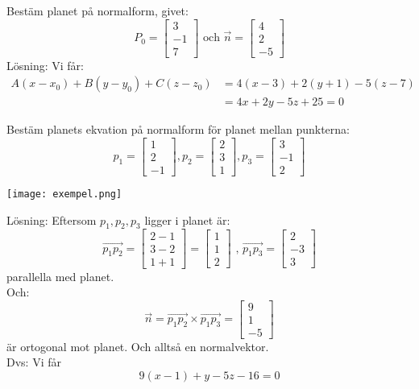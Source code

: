 \begin{Ex}
    Bestäm planet på normalform, givet:
    \[
        P_0 = \begin{bmatrix} 3\\-1\\7 \end{bmatrix} \mbox{ och } \vec{n} = \begin{bmatrix} 4\\2\\-5 \end{bmatrix}
    \]
    Lösning: Vi får:
    \begin{align*}
    A(x-x_0) + B(y-y_0) + C(z-z_0) &= 4(x-3) + 2(y+1) -5(z-7)\\&= 4x + 2y -5z + 25 = 0
    \end{align*}
\end{Ex}
\begin{Ex}
    Bestäm planets ekvation på normalform för planet mellan punkterna:
    \[
        p_1 = \begin{bmatrix} 1\\2\\-1 \end{bmatrix}, p_2 = \begin{bmatrix} 2\\3\\1 \end{bmatrix}, p_3 = \begin{bmatrix} 3\\-1\\2 \end{bmatrix}
    \]
    \begin{center}
        \texttt{[image: exempel.png]}
    \end{center}
    Lösning: Eftersom $p_1, p_2, p_3$ ligger i planet är:
    \[
        \overrightarrow{p_1p_2} = \begin{bmatrix} 2-1\\3-2\\1+1 \end{bmatrix} = \begin{bmatrix} 1\\1\\2 \end{bmatrix} \mbox{ , } \overrightarrow{p_1p_3} = \begin{bmatrix} 2\\-3\\3 \end{bmatrix}
    \]
    parallella med planet.\\
    Och:
    \[
        \vec{n} = \overrightarrow{p_1p_2} \times \overrightarrow{p_1p_3} = \begin{bmatrix} 9\\1\\-5 \end{bmatrix}
    \]
    är ortogonal mot planet. Och alltså en normalvektor.\\
    Dvs: Vi får
    \[
        9(x-1) + y -5z - 16 = 0
    \]
\end{Ex}

